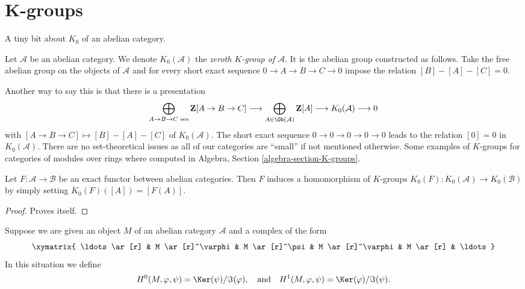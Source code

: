 \section{K-groups}
\label{section-K-groups}

\noindent
A tiny bit about $K_0$ of an abelian category.

\begin{definition}
\label{definition-K-zero}
Let $\mathcal{A}$ be an abelian category.
We denote $K_0(\mathcal{A})$ the
{\it zeroth $K$-group of $\mathcal{A}$}.
It is the abelian group constructed as follows.
Take the free abelian group
on the objects of $\mathcal{A}$
and for every short exact sequence
$0 \to A \to B \to C \to 0$
impose the relation $[B] - [A] - [C] = 0$.
\end{definition}

\noindent
Another way to say this is that there is a presentation
$$
\bigoplus_{A \to B \to C\text{ ses}}
\mathbf{Z}[A \to B \to C]
\longrightarrow
\bigoplus_{A \in \Ob(\mathcal{A})}
\mathbf{Z}[A]
\longrightarrow
K_0(\mathcal{A})
\longrightarrow
0
$$
with $[A \to B \to C] \mapsto [B] - [A] - [C]$ of $K_0(\mathcal{A})$.
The short exact sequence $0 \to 0 \to 0 \to 0 \to 0$
leads to the relation $[0] = 0$ in $K_0(\mathcal{A})$.
There are no set-theoretical issues as all of our categories
are ``small'' if not mentioned otherwise.
Some examples of $K$-groups for categories of modules
over rings where computed in
Algebra, Section \ref{algebra-section-K-groups}.

\begin{lemma}
\label{lemma-exact-functor-K-groups}
Let $F : \mathcal{A} \to \mathcal{B}$ be an exact functor between
abelian categories. Then $F$ induces a homomorphism of $K$-groups
$K_0(F) : K_0(\mathcal{A}) \to K_0(\mathcal{B})$ by simply setting
$K_0(F)([A]) = [F(A)]$.
\end{lemma}

\begin{proof}
Proves itself.
\end{proof}

\noindent
Suppose we are given an object $M$ of an abelian category $\mathcal{A}$
and a complex of the form
\begin{equation}
\label{equation-cyclic-complex}
\xymatrix{
\ldots \ar[r] &
M \ar[r]^\varphi &
M \ar[r]^\psi &
M \ar[r]^\varphi &
M \ar[r] & \ldots
}
\end{equation}
In this situation we define
$$
H^0(M, \varphi, \psi) = \Ker(\psi)/\Im(\varphi)
, \quad\text{and}\quad
H^1(M, \varphi, \psi) = \Ker(\varphi)/\Im(\psi).
$$

